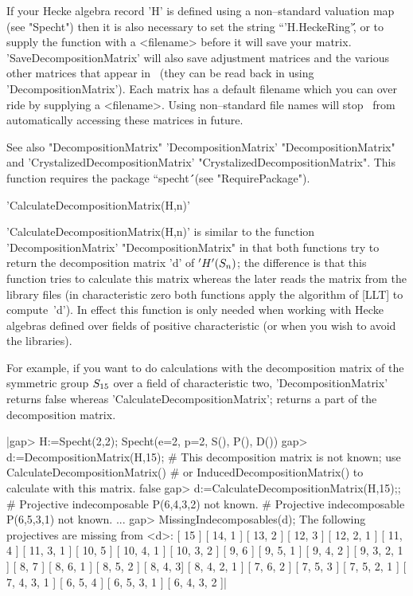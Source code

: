 If your Hecke algebra record 'H' is defined using a non--standard 
valuation map (see "Specht") then it is also necessary to set the string 
``'H.HeckeRing'\'\', or to supply the function with a <filename> before
it will save your matrix. 'SaveDecompositionMatrix' will also save 
adjustment matrices and the various other matrices that appear in \Specht\
(they can be read back in using 'DecompositionMatrix'). Each matrix 
has a default filename which you can over ride by supplying a <filename>. 
Using non--standard file names will stop \Specht\ from automatically 
accessing these matrices in future. 

See also "DecompositionMatrix" 'DecompositionMatrix' 
"DecompositionMatrix" and 'CrystalizedDecompositionMatrix' 
"CrystalizedDecompositionMatrix". This function requires the package 
``specht\'\'\ (see "RequirePackage").



'CalculateDecompositionMatrix(H,n)'

'CalculateDecompositionMatrix(H,n)' is similar to the function
'DecompositionMatrix' "DecompositionMatrix" in that both functions try to
return the decomposition matrix 'd' of $'H'(S_n)$; the difference is 
that this function tries to calculate this matrix whereas the later reads 
the matrix from the library files (in characteristic zero both functions 
apply the algorithm of [LLT] to compute~'d'). In effect this function is 
only needed when working with Hecke algebras defined over fields of positive 
characteristic (or when you wish to avoid the libraries). 

For example, if you want to do calculations with the decomposition matrix of 
the symmetric group $S_{15}$ over a field of characteristic two, 
'DecompositionMatrix' returns false whereas 'CalculateDecompositionMatrix'; 
returns a part of the decomposition matrix.

|gap> H:=Specht(2,2);
Specht(e=2, p=2, S(), P(), D())
gap> d:=DecompositionMatrix(H,15); 
# This decomposition matrix is not known; use CalculateDecompositionMatrix()
# or InducedDecompositionMatrix() to calculate with this matrix.
false
gap> d:=CalculateDecompositionMatrix(H,15);;
# Projective indecomposable P(6,4,3,2) not known.
# Projective indecomposable P(6,5,3,1) not known.
...
gap> MissingIndecomposables(d);
The following projectives are missing from <d>:
    [ 15 ]  [ 14, 1 ]  [ 13, 2 ]  [ 12, 3 ]  [ 12, 2, 1 ]  [ 11, 4 ]  
[ 11, 3, 1 ]  [ 10, 5 ]  [ 10, 4, 1 ]  [ 10, 3, 2 ]  [ 9, 6 ]  [ 9, 5, 1 ]
[ 9, 4, 2 ]  [ 9, 3, 2, 1 ]  [ 8, 7 ]  [ 8, 6, 1 ]  [ 8, 5, 2 ]  [ 8, 4, 3]  
[ 8, 4, 2, 1 ]  [ 7, 6, 2 ]  [ 7, 5, 3 ]  [ 7, 5, 2, 1 ]  [ 7, 4, 3, 1 ]  
[ 6, 5, 4 ]  [ 6, 5, 3, 1 ]  [ 6, 4, 3, 2 ]|

